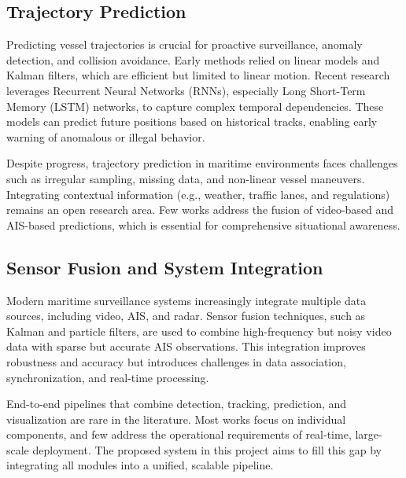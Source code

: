 \subsection{Trajectory Prediction}
Predicting vessel trajectories is crucial for proactive surveillance, anomaly detection, and collision avoidance. Early methods relied on linear models and Kalman filters, which are efficient but limited to linear motion. Recent research leverages Recurrent Neural Networks (RNNs), especially Long Short-Term Memory (LSTM) networks, to capture complex temporal dependencies. These models can predict future positions based on historical tracks, enabling early warning of anomalous or illegal behavior.

Despite progress, trajectory prediction in maritime environments faces challenges such as irregular sampling, missing data, and non-linear vessel maneuvers. Integrating contextual information (e.g., weather, traffic lanes, and regulations) remains an open research area. Few works address the fusion of video-based and AIS-based predictions, which is essential for comprehensive situational awareness.

\subsection{Sensor Fusion and System Integration}
Modern maritime surveillance systems increasingly integrate multiple data sources, including video, AIS, and radar. Sensor fusion techniques, such as Kalman and particle filters, are used to combine high-frequency but noisy video data with sparse but accurate AIS observations. This integration improves robustness and accuracy but introduces challenges in data association, synchronization, and real-time processing.

End-to-end pipelines that combine detection, tracking, prediction, and visualization are rare in the literature. Most works focus on individual components, and few address the operational requirements of real-time, large-scale deployment. The proposed system in this project aims to fill this gap by integrating all modules into a unified, scalable pipeline.

